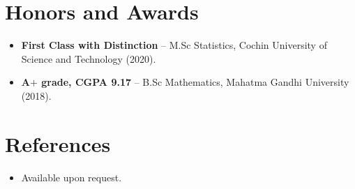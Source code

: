 \documentclass[11pt,a4paper,sans]{moderncv}
\begin{document}

\section{Honors and Awards}
\vspace{1pt}
\begin{itemize}
\item{\textbf{First Class with Distinction} -- M.Sc Statistics, Cochin University of Science and Technology (2020).}
\item{\textbf{A$+$ grade, CGPA 9.17} -- B.Sc Mathematics, Mahatma Gandhi University (2018).}
\end{itemize}


\section{References}
\vspace{1pt}
\begin{itemize}
\item{Available upon request.}
\end{itemize}
\end{document}
